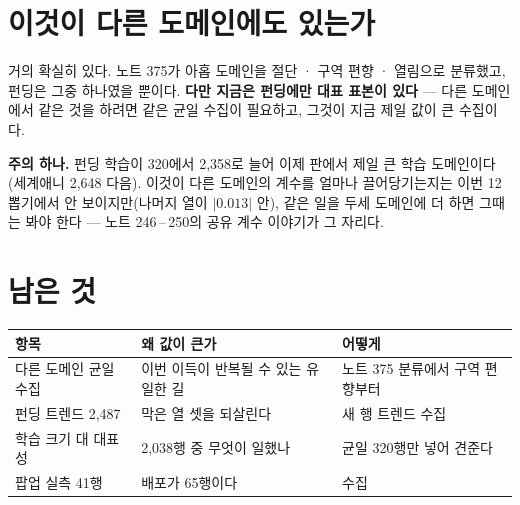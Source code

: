 \documentclass[11pt]{article}
\begin{document}
\section{이것이 다른 도메인에도 있는가}

거의 확실히 있다. 노트 375가 아홉 도메인을 절단 · 구역 편향 · 열림으로
분류했고, 펀딩은 그중 하나였을 뿐이다. \textbf{다만 지금은 펀딩에만 대표
표본이 있다} --- 다른 도메인에서 같은 것을 하려면 같은 균일 수집이 필요하고,
그것이 지금 제일 값이 큰 수집이다.

\textbf{주의 하나.} 펀딩 학습이 320에서 2,358로 늘어 이제 판에서 제일 큰
학습 도메인이다(세계애니 2,648 다음). 이것이 다른 도메인의 계수를 얼마나
끌어당기는지는 이번 12뽑기에서 안 보이지만(나머지 열이 $|0.013|$ 안),
같은 일을 두세 도메인에 더 하면 그때는 봐야 한다 --- 노트 246\,--\,250의
공유 계수 이야기가 그 자리다.

\section{남은 것}

\begin{center}
\begin{tabular}{lll}
\hline
항목 & 왜 값이 큰가 & 어떻게 \\
\hline
다른 도메인 균일 수집 & 이번 이득이 반복될 수 있는 유일한 길 & 노트 375 분류에서 구역 편향부터 \\
펀딩 트렌드 2,487 & 막은 열 셋을 되살린다 & 새 행 트렌드 수집 \\
학습 크기 대 대표성 & 2,038행 중 무엇이 일했나 & 균일 320행만 넣어 견준다 \\
팝업 실측 41행 & 배포가 65행이다 & 수집 \\
\hline
\end{tabular}
\end{center}
\end{document}
